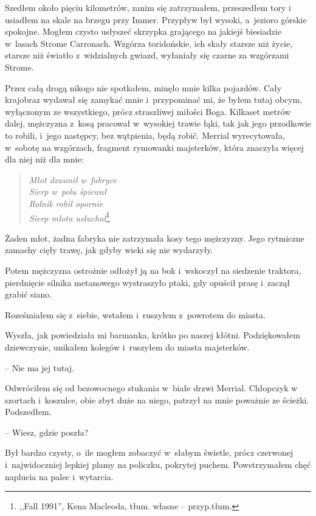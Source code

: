 \documentclass[oneside,polish,11pt,sfheadings]{mwbk}
\begin{document}
Szedłem około pięciu kilometrów, zanim się zatrzymałem, przeszedłem tory
i usiadłem na skale na brzegu przy Immer. Przypływ był wysoki, a~jezioro
górskie spokojne. Mogłem czysto usłyszeć skrzypka grającego na jakiejś
biesiadzie w~lasach Strome Carronach. Wzgórza toridońskie, ich skały
starsze niż życie, starsze niż światło z~widzialnych gwiazd, wyłaniały
się czarne za wzgórzami Strome.

Przez całą drogą nikogo nie spotkałem, minęło mnie kilka pojazdów. Cały
krajobraz wydawał się zamykać mnie i~przypominać mi, że byłem tutaj
obcym, wyłączonym ze wszystkiego, prócz straszliwej miłości Boga.
Kilkaset metrów dalej, mężczyzna z~kosą pracował w~wysokiej trawie łąki,
tak jak jego przodkowie to robili, i~jego następcy, bez wątpienia, będą
robić. Merrial wyrecytowała, w~sobotę na wzgórzach, fragment rymowanki
majsterków, która znaczyła więcej dla niej niż dla mnie:

\begin{verse}
\textit{Młot dzwonił w~fabryce}\\
\textit{Sierp w~polu śpiewał}\\
\textit{Rolnik robił opornie}\\
\textit{Sierp młota usłuchał}\footnote{ ,,Fall 1991'', Kena Macleoda, tłum.
własne -- przyp.tłum.}\\
\end{verse}

Żaden młot, żadna fabryka nie zatrzymała kosy tego mężczyzny. Jego
rytmiczne zamachy cięły trawę, jak gdyby wieki się nie wydarzyły.

Potem mężczyzna ostrożnie odłożył ją na bok i~wskoczył na siedzenie
traktora, pierdnięcie silnika metanowego wystraszyło ptaki, gdy opuścił
prasę i~zaczął grabić siano.

Roześmiałem się z~siebie, wstałem i~ruszyłem z~powrotem do miasta.

Wyszła, jak powiedziała mi barmanka, krótko po naszej kłótni.
Podziękowałem dziewczynie, unikałem kolegów i~ruszyłem do miasta
majsterków.

-- Nie ma jej tutaj.

Odwróciłem się od bezowocnego stukania w~białe drzwi Merrial. Chłopczyk
w szortach i~koszulce, obie zbyt duże na niego, patrzył na mnie poważnie
ze ścieżki. Podszedłem.

-- Wiesz, gdzie poszła?

Był bardzo czysty, o~ile mogłem zobaczyć w~słabym świetle, prócz
czerwonej i~najwidoczniej lepkiej plamy na policzku, pokrytej puchem.
Powstrzymałem chęć naplucia na palec i~wytarcia.
\end{document}

